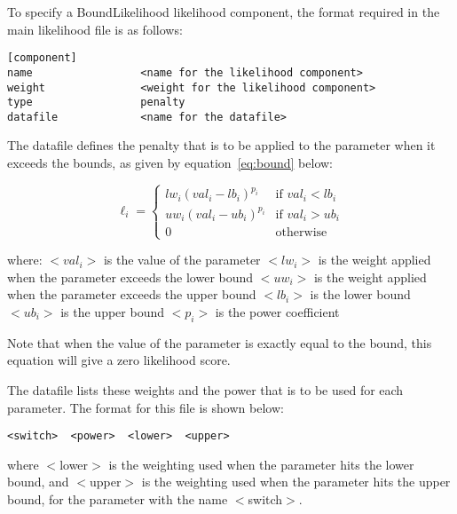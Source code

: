 \documentclass[10pt,twoside]{book}
\begin{document}
\bigskip
To specify a BoundLikelihood likelihood component, the format required in the main likelihood file is as follows:

{\small\begin{verbatim}
[component]
name                 <name for the likelihood component>
weight               <weight for the likelihood component>
type                 penalty
datafile             <name for the datafile>
\end{verbatim}}

The datafile defines the penalty that is to be applied to the parameter when it exceeds the bounds, as given by equation~\ref{eq:bound} below:

\begin{equation}\label{eq:bound}
\ell_{i} =
\begin{cases}
lw_{i} (val_{i} - lb_{i})^{p_{i}} & \textrm{if $val_{i} < lb_i$} \\
uw_{i} (val_{i} - ub_{i})^{p_{i}} & \textrm{if $val_{i} > ub_i$} \\
0 & \textrm{otherwise}
\end{cases}
\end{equation}

where:\newline
$<val_i>$ is the value of the parameter\newline
$<lw_i>$ is the weight applied when the parameter exceeds the lower bound\newline
$<uw_i>$ is the weight applied when the parameter exceeds the upper bound\newline
$<lb_i>$ is the lower bound\newline
$<ub_i>$ is the upper bound\newline
$<p_i>$ is the power coefficient\newline

Note that when the value of the parameter is exactly equal to the bound, this equation will give a zero likelihood score.

\bigskip
The datafile lists these weights and the power that is to be used for each parameter.  The format for this file is shown below:

{\small\begin{verbatim}
<switch>  <power>  <lower>  <upper>
\end{verbatim}}

where $<$lower$>$ is the weighting used when the parameter hits the lower bound, and $<$upper$>$ is the weighting used when the parameter hits the upper bound, for the parameter with the name $<$switch$>$.
\end{document}
